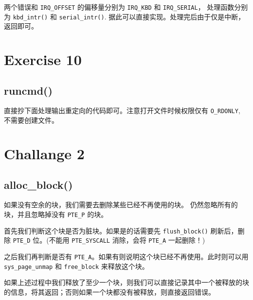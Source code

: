 \documentclass[11pt]{article}
\begin{document}
		\par 两个错误和 \texttt{IRQ\_OFFSET} 的偏移量分别为 \texttt{IRQ\_KBD} 和 \texttt{IRQ\_SERIAL}， 处理函数分别为 \texttt{kbd\_intr()} 和 \texttt{serial\_intr()}. 据此可以直接实现。处理完后由于仅是中断，返回即可。
		
	\section{Exercise 10}
	
	\subsection*{runcmd()}
		
		\par 直接抄下面处理输出重定向的代码即可。注意打开文件时候权限仅有 \texttt{O\_RDONLY}, 不需要创建文件。
		
	\section{Challange 2}
	
	\subsection*{alloc\_block()}
	
		\par 如果没有空余的块，我们需要去删除某些已经不再使用的块。 仍然忽略所有的块，并且忽略掉没有 \texttt{PTE\_P} 的块。
		
		\par 首先我们判断这个块是否为脏块。如果是的话需要先 \texttt{flush\_block()} 刷新后，删除 \texttt{PTE\_D} 位。(不能用 \texttt{PTE\_SYSCALL} 消除，会将 \texttt{PTE\_A} 一起删除！)
		
		\par 之后我们再判断是否有 \texttt{PTE\_A}。如果有则说明这个块已经不再使用。此时则可以用 \texttt{sys\_page\_unmap} 和 \texttt{free\_block} 来释放这个块。
		
		\par 如果上述过程中我们释放了至少一个块，则我们可以直接记录其中一个被释放的块的信息，将其返回；否则如果一个块都没有被释放，则直接返回错误。
		
	
			
\end{document}
